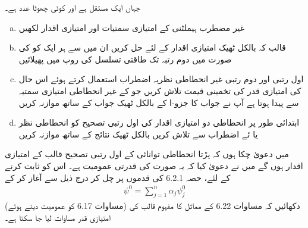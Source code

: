 جہاں  ایک مستقل ہے اور  کوئی چھوٹا عدد    ہے۔
\begin{enumerate}[a.]
\item
غیر مضطرب ہیملٹنی   کے امتیازی سمتیات اور امتیازی اقدار لکھیں 
\item
قالب  کہ بالکل ٹھیک امتیازی اقدار  کے لئے حل کریں ان میں سے ہر ایک کو  کی صورت میں دوم رتبہ تک طاقتی تسلسل کی روپ میں پھیلائیں 
\item
اول رتبی اور دوم رتبی غیر انحطاطی نظریہ اضطراب استعمال کرتے ہوئے اس حال کی امتیازی قدر کی تخمینی قیمت تلاش کریں جو  کے غیر انحطاطی امتیازی سمتیہ سے پیدا ہوتا ہے آپ نے جواب کا جزو-ا کے بالکل ٹھیک جواب کے ساتھ موازنہ کریں 
\item
ابتدائی طور پر  انحطاطی  دو امتیازی اقدار  کی اول رتبی تصحیح  کو انحطاطی نظر یا ئے اضطراب سے تلاش کریں  بالکل ٹھیک نتائج کے ساتھ موازنہ کریں 
\end{enumerate}
میں دعویٰ چکا ہوں کہ  پڑتا انحطاطی توانائی کے اول رتبی تصحیح  قالب  کے امتیازی اقدار ہوں گے میں نے دعویٰ کیا کہ یہ  صورت کی قدرتی عمومیت ہے۔ اس کو ثابت کرنے کے لئے،  حصہ 6.2.1 کی قدموں پر چل کر درج ذیل سے آغاز کر کے
\begin{align*}
\psi^0 = \sum_{j = 1}^n \alpha_j \psi_j^0
\end{align*}
(مساوات 6.17 کو  عمومیت  دیتے ہوئے)  دکھائیں کہ مساوات  6.22  کے مماثل کا مفہوم   قالب  کی امتیازی قدر مساوات  لیا جا سکتا ہے۔ 

